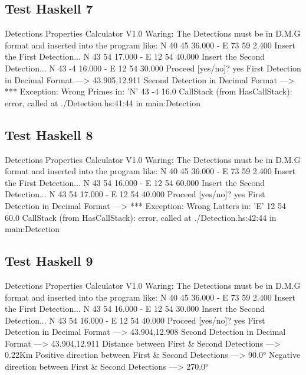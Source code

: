 \documentclass{article}
\begin{document}
\subsection*{Test Haskell 7}
	\begin{spverbatim}
		Detections Properties Calculator V1.0 
		Waring: The Detections must be in D.M.G format and inserted into the program like: N 40 45 36.000 - E 73 59 2.400
		Insert the First Detection...
		N 43 54 17.000 - E 12 54 40.000
		Insert the Second Detection...
		N 43 -4 16.000 - E 12 54 30.000
		Proceed [yes/no]?
		yes
		First Detection in Decimal Format ---> 43.905,12.911
		Second Detection in Decimal Format ---> *** Exception: Wrong Primes in:  'N' 43 -4 16.0
		CallStack (from HasCallStack):
		error, called at ./Detection.hs:41:44 in main:Detection
	\end{spverbatim}

\subsection*{Test Haskell 8}
	\begin{spverbatim}
		Detections Properties Calculator V1.0 
		Waring: The Detections must be in D.M.G format and inserted into the program like: N 40 45 36.000 - E 73 59 2.400
		Insert the First Detection...
		N 43 54 16.000 - E 12 54 60.000
		Insert the Second Detection...
		N 43 54 17.000 - E 12 54 40.000
		Proceed [yes/no]?
		yes
		First Detection in Decimal Format ---> *** Exception: Wrong Latters in:  'E' 12 54 60.0
		CallStack (from HasCallStack):
		error, called at ./Detection.hs:42:44 in main:Detection
	\end{spverbatim}

\subsection*{Test Haskell 9}
	\begin{spverbatim}
		Detections Properties Calculator V1.0 
		Waring: The Detections must be in D.M.G format and inserted into the program like: N 40 45 36.000 - E 73 59 2.400
		Insert the First Detection...
		N 43 54 16.000 - E 12 54 30.000
		Insert the Second Detection...
		N 43 54 16.000 - E 12 54 40.000
		Proceed [yes/no]?
		yes
		First Detection in Decimal Format ---> 43.904,12.908
		Second Detection in Decimal Format ---> 43.904,12.911
		Distance between First & Second Detections ---> 0.22Km
		Positive direction between First & Second Detections ---> 90.0°
		Negative direction between First & Second Detections ---> 270.0°
	\end{spverbatim}
\end{document}
